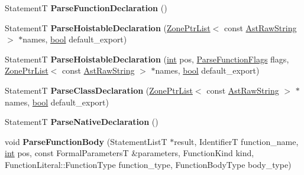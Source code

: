 \begin{DoxyCompactItemize}
\item 
\mbox{\label{classv8_1_1internal_1_1ParserBase_a7167a5d3b2f608f261726c6955609972}} 
StatementT {\bfseries Parse\+Function\+Declaration} ()
\item 
\mbox{\label{classv8_1_1internal_1_1ParserBase_abe240f038c4192035dc1312edada6e11}} 
StatementT {\bfseries Parse\+Hoistable\+Declaration} (\mbox{\hyperlink{classv8_1_1internal_1_1ZoneList}{Zone\+Ptr\+List}}$<$ const \mbox{\hyperlink{classv8_1_1internal_1_1AstRawString}{Ast\+Raw\+String}} $>$ $\ast$names, \mbox{\hyperlink{classbool}{bool}} default\+\_\+export)
\item 
\mbox{\label{classv8_1_1internal_1_1ParserBase_affb684e6840ef5aa7fe24a5aeb540de4}} 
StatementT {\bfseries Parse\+Hoistable\+Declaration} (\mbox{\hyperlink{classint}{int}} pos, \mbox{\hyperlink{classv8_1_1base_1_1Flags}{Parse\+Function\+Flags}} flags, \mbox{\hyperlink{classv8_1_1internal_1_1ZoneList}{Zone\+Ptr\+List}}$<$ const \mbox{\hyperlink{classv8_1_1internal_1_1AstRawString}{Ast\+Raw\+String}} $>$ $\ast$names, \mbox{\hyperlink{classbool}{bool}} default\+\_\+export)
\item 
\mbox{\label{classv8_1_1internal_1_1ParserBase_a9e723fd74788f821e56279e5df643b9b}} 
StatementT {\bfseries Parse\+Class\+Declaration} (\mbox{\hyperlink{classv8_1_1internal_1_1ZoneList}{Zone\+Ptr\+List}}$<$ const \mbox{\hyperlink{classv8_1_1internal_1_1AstRawString}{Ast\+Raw\+String}} $>$ $\ast$names, \mbox{\hyperlink{classbool}{bool}} default\+\_\+export)
\item 
\mbox{\label{classv8_1_1internal_1_1ParserBase_a1bf0a42af8f0d042c6d28ad022a32ff4}} 
StatementT {\bfseries Parse\+Native\+Declaration} ()
\item 
\mbox{\label{classv8_1_1internal_1_1ParserBase_a62308c0fbdc81fb2c6875fc84fbe358b}} 
void {\bfseries Parse\+Function\+Body} (Statement\+ListT $\ast$result, IdentifierT function\+\_\+name, \mbox{\hyperlink{classint}{int}} pos, const Formal\+ParametersT \&parameters, Function\+Kind kind, Function\+Literal\+::\+Function\+Type function\+\_\+type, Function\+Body\+Type body\+\_\+type)

\end{DoxyCompactItemize}
